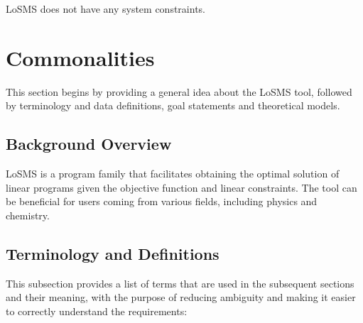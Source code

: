\documentclass[12pt]{article}
\newcommand{\famname}{LoSMS} %
\begin{document}
\famname{} does not have any system constraints.

\section{Commonalities} \label{Sec_Commonalities}

This section begins by providing a general idea about the \famname{} tool, 
followed by terminology and data definitions, goal statements and theoretical 
models.

\subsection{Background Overview} \label{Sec_Background}

\famname{} is a program family that facilitates obtaining the optimal solution 
of linear programs given the objective function and linear constraints. The 
tool can be beneficial for users coming from various fields, including physics 
and chemistry.


\subsection{Terminology and  Definitions}

This subsection provides a list of terms that are used in the subsequent
sections and their meaning, with the purpose of reducing ambiguity and making it
easier to correctly understand the requirements:
\end{document}
